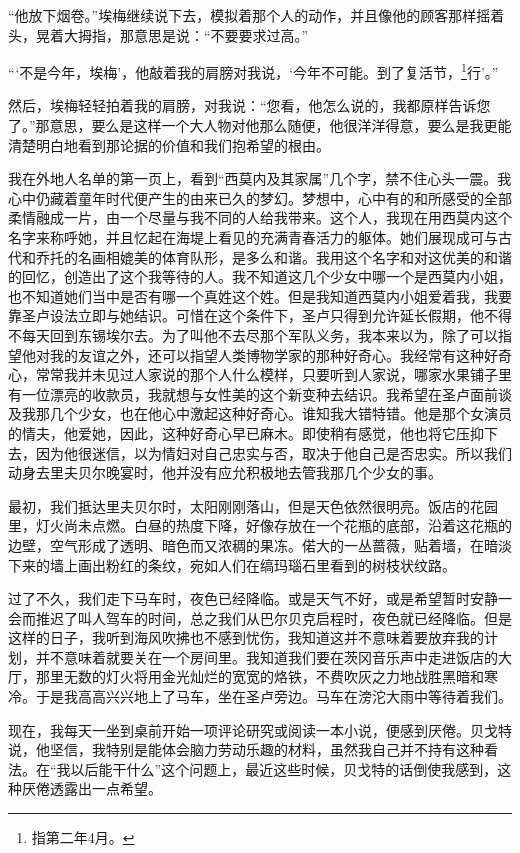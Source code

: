 \par “他放下烟卷。”埃梅继续说下去，模拟着那个人的动作，并且像他的顾客那样摇着头，晃着大拇指，那意思是说：“不要要求过高。”
\par “‘不是今年，埃梅’，他敲着我的肩膀对我说，‘今年不可能。到了复活节，\footnote{指第二年4月。}行’。”
\par 然后，埃梅轻轻拍着我的肩膀，对我说：“您看，他怎么说的，我都原样告诉您了。”那意思，要么是这样一个大人物对他那么随便，他很洋洋得意，要么是我更能清楚明白地看到那论据的价值和我们抱希望的根由。
\par 我在外地人名单的第一页上，看到“西莫内及其家属”几个字，禁不住心头一震。我心中仍藏着童年时代便产生的由来已久的梦幻。梦想中，心中有的和所感受的全部柔情融成一片，由一个尽量与我不同的人给我带来。这个人，我现在用西莫内这个名字来称呼她，并且忆起在海堤上看见的充满青春活力的躯体。她们展现成可与古代和乔托的名画相媲美的体育队形，是多么和谐。我用这个名字和对这优美的和谐的回忆，创造出了这个我等待的人。我不知道这几个少女中哪一个是西莫内小姐，也不知道她们当中是否有哪一个真姓这个姓。但是我知道西莫内小姐爱着我，我要靠圣卢设法立即与她结识。可惜在这个条件下，圣卢只得到允许延长假期，他不得不每天回到东锡埃尔去。为了叫他不去尽那个军队义务，我本来以为，除了可以指望他对我的友谊之外，还可以指望人类博物学家的那种好奇心。我经常有这种好奇心，常常我并未见过人家说的那个人什么模样，只要听到人家说，哪家水果铺子里有一位漂亮的收款员，我就想与女性美的这个新变种去结识。我希望在圣卢面前谈及我那几个少女，也在他心中激起这种好奇心。谁知我大错特错。他是那个女演员的情夫，他爱她，因此，这种好奇心早已麻木。即使稍有感觉，他也将它压抑下去，因为他很迷信，以为情妇对自己忠实与否，取决于他自己是否忠实。所以我们动身去里夫贝尔晚宴时，他并没有应允积极地去管我那几个少女的事。
\par 最初，我们抵达里夫贝尔时，太阳刚刚落山，但是天色依然很明亮。饭店的花园里，灯火尚未点燃。白昼的热度下降，好像存放在一个花瓶的底部，沿着这花瓶的边壁，空气形成了透明、暗色而又浓稠的果冻。偌大的一丛蔷薇，贴着墙，在暗淡下来的墙上画出粉红的条纹，宛如人们在缟玛瑙石里看到的树枝状纹路。
\par 过了不久，我们走下马车时，夜色已经降临。或是天气不好，或是希望暂时安静一会而推迟了叫人驾车的时间，总之我们从巴尔贝克启程时，夜色就已经降临。但是这样的日子，我听到海风吹拂也不感到忧伤，我知道这并不意味着要放弃我的计划，并不意味着就要关在一个房间里。我知道我们要在茨冈音乐声中走进饭店的大厅，那里无数的灯火将用金光灿烂的宽宽的烙铁，不费吹灰之力地战胜黑暗和寒冷。于是我高高兴兴地上了马车，坐在圣卢旁边。马车在滂沱大雨中等待着我们。
\par 现在，我每天一坐到桌前开始一项评论研究或阅读一本小说，便感到厌倦。贝戈特说，他坚信，我特别是能体会脑力劳动乐趣的材料，虽然我自己并不持有这种看法。在“我以后能干什么”这个问题上，最近这些时候，贝戈特的话倒使我感到，这种厌倦透露出一点希望。
